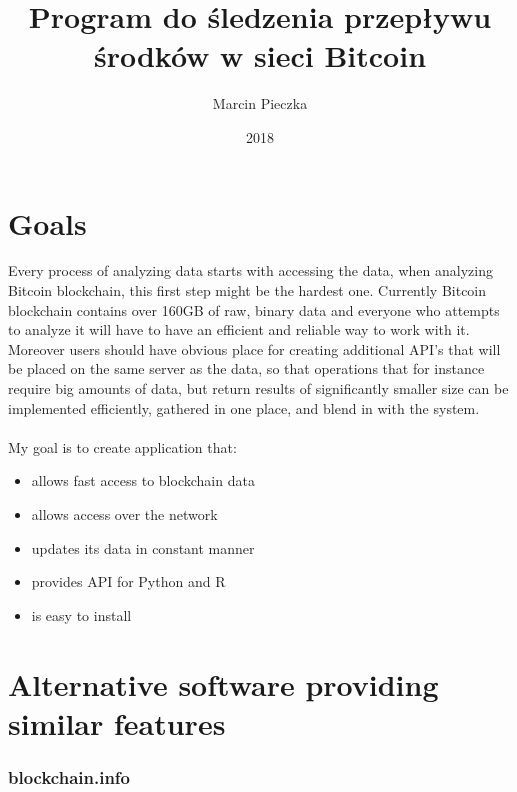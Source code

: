 \documentclass[12pt, en, eng]{mgr}
\begin{document}
\title{Program do śledzenia przepływu środków w sieci Bitcoin}
\date{2018}
\author{Marcin Pieczka}
\maketitle

\tableofcontents

\section{Goals}

Every process of analyzing data starts with accessing the data, when analyzing Bitcoin blockchain, this first step might be the hardest one. Currently Bitcoin blockchain contains over 160GB of raw, binary data and everyone who attempts to analyze it will have to have an efficient and reliable way to work with it. Moreover users should have obvious place for creating additional API's that will be placed on the same server as the data, so that operations that for instance require big amounts of data, but return results of significantly smaller size can be implemented efficiently, gathered in one place, and blend in with the system. 
\\
\\
My goal is to create application that: 
\begin{itemize}

\item
allows fast access to blockchain data
\item
allows access over the network
\item
updates its data in constant manner
\item
provides API for Python and R
\item
is easy to install

\end{itemize}

\section{Alternative software providing similar features}
\subsubsection*{blockchain.info}
\end{document}
